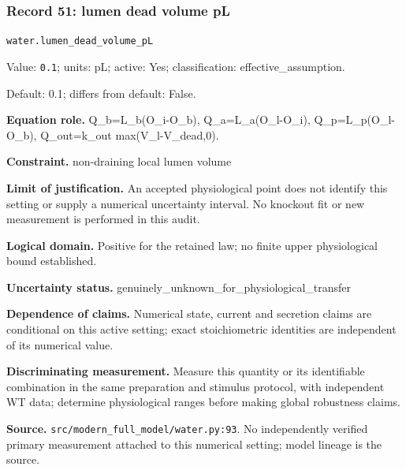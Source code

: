 \subsubsection*{Record 51: lumen dead volume pL}
{\small \nolinkurl{water.lumen_dead_volume_pL}\par

Value: \texttt{0.1}; units: pL; active: Yes; classification: effective\_assumption.\par

Default: 0.1; differs from default: False.\par

\textbf{Equation role.} Q\_b=L\_b(O\_i-O\_b), Q\_a=L\_a(O\_l-O\_i), Q\_p=L\_p(O\_l-O\_b), Q\_out=k\_out max(V\_l-V\_dead,0).\par

\textbf{Constraint.} non-draining local lumen volume\par

\textbf{Limit of justification.} An accepted physiological point does not identify this setting or supply a numerical uncertainty interval. No knockout fit or new measurement is performed in this audit.\par

\textbf{Logical domain.} Positive for the retained law; no finite upper physiological bound established.\par

\textbf{Uncertainty status.} genuinely\_unknown\_for\_physiological\_transfer\par

\textbf{Dependence of claims.} Numerical state, current and secretion claims are conditional on this active setting; exact stoichiometric identities are independent of its numerical value.\par

\textbf{Discriminating measurement.} Measure this quantity or its identifiable combination in the same preparation and stimulus protocol, with independent WT data; determine physiological ranges before making global robustness claims.\par

\textbf{Source.} \nolinkurl{src/modern_full_model/water.py:93}. No independently verified primary measurement attached to this numerical setting; model lineage is the source.\par}

